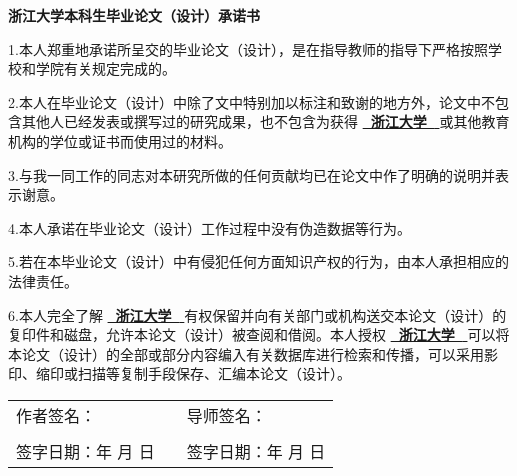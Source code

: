 \par
\begin{center}
    \textbf{{ \hwfs 浙江大学本科生毕业论文（设计）承诺书}}
\end{center}
\vspace{0.5cm}
\begin{spacing}{1.8}
    {\hwfs {}
            1.本人郑重地承诺所呈交的毕业论文（设计），是在指导教师的指导下严格按照学校和学院有关规定完成的。

            2.本人在毕业论文（设计）中除了文中特别加以标注和致谢的地方外，论文中不包含其他人已经发表或撰写过的研究成果，也不包含为获得 \underline{\bf ~浙江大学~ } 或其他教育机构的学位或证书而使用过的材料。

            3.与我一同工作的同志对本研究所做的任何贡献均已在论文中作了明确的说明并表示谢意。

            4.本人承诺在毕业论文（设计）工作过程中没有伪造数据等行为。

            5.若在本毕业论文（设计）中有侵犯任何方面知识产权的行为，由本人承担相应的法律责任。

            6.本人完全了解 \underline{\bf ~浙江大学~ } 有权保留并向有关部门或机构送交本论文（设计）的复印件和磁盘，允许本论文（设计）被查阅和借阅。本人授权 \underline{\bf ~浙江大学~ } 可以将本论文（设计）的全部或部分内容编入有关数据库进行检索和传播，可以采用影印、缩印或扫描等复制手段保存、汇编本论文（设计）。
            \\
            \begin{table}[thp]    
                \hwfs   
                \renewcommand\arraystretch{1.5}
                \begin{tabular}{lcl}
                   作者签名： & & 导师签名： \\ 
                   \\
                   签字日期：\qquad 年 \quad 月 \quad 日 & \hspace{2.75cm} & 签字日期：\qquad 年 \quad 月 \quad 日
                \end{tabular}
            \end{table}
            
    }
\end{spacing}
\newpage    